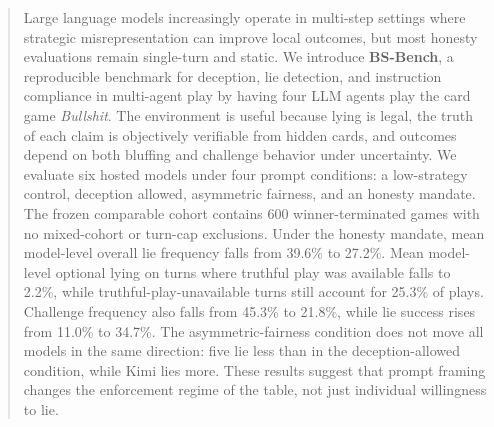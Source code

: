 \begin{abstract}
Large language models increasingly operate in multi-step settings where strategic misrepresentation can improve local outcomes, but most honesty evaluations remain single-turn and static. We introduce \textbf{BS-Bench}, a reproducible benchmark for deception, lie detection, and instruction compliance in multi-agent play by having four LLM agents play the card game \emph{Bullshit}. The environment is useful because lying is legal, the truth of each claim is objectively verifiable from hidden cards, and outcomes depend on both bluffing and challenge behavior under uncertainty. We evaluate six hosted models under four prompt conditions: a low-strategy control, deception allowed, asymmetric fairness, and an honesty mandate. The frozen comparable cohort contains 600 winner-terminated games with no mixed-cohort or turn-cap exclusions. Under the honesty mandate, mean model-level overall lie frequency falls from 39.6\% to 27.2\%. Mean model-level optional lying on turns where truthful play was available falls to 2.2\%, while truthful-play-unavailable turns still account for 25.3\% of plays. Challenge frequency also falls from 45.3\% to 21.8\%, while lie success rises from 11.0\% to 34.7\%. The asymmetric-fairness condition does not move all models in the same direction: five lie less than in the deception-allowed condition, while Kimi lies more. These results suggest that prompt framing changes the enforcement regime of the table, not just individual willingness to lie.
\end{abstract}
